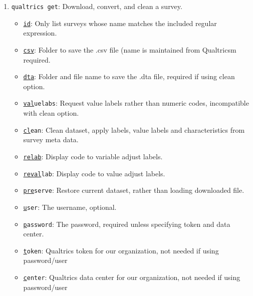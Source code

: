 {\begin{enumerate}
\begin{itemize}
\item \texttt{\underline{creater}ange(MDY:MDY)}: Only list surveys that were created in a date range.
\item \texttt{\underline{u}ser}: The username, optional.
\item \texttt{\underline{p}assword}: The password, required unless specifying token and data center.
\item \texttt{\underline{t}oken}: Qualtrics token for our organization, not needed if using password/user.
\item \texttt{\underline{c}enter}: Qualtrics data center for our organization, not needed if using password/user.
\end{itemize}
\item \texttt{qualtrics get}: Download, convert, and clean a survey.
\begin{itemize}
\item \texttt{\underline{id}}: Only list surveys whose name matches the included regular expression.
\item \texttt{\underline{csv}}: Folder to save the .csv file (name is maintained from Qualtricsm required.
\item \texttt{\underline{dta}}: Folder and file name to save the .dta file, required if using clean option.
\item \texttt{\underline{val}uelabs}: Request value labels rather than numeric codes, incompatible with clean option.
\item \texttt{\underline{cl}ean}: Clean dataset, apply labels, value labels and characteristics from survey meta data.
\item \texttt{\underline{relab}}: Display code to variable adjust labels.
\item \texttt{\underline{reval}lab}: Display code to value adjust labels.
\item \texttt{\underline{pre}serve}: Restore current dataset, rather than loading downloaded file.
\item \texttt{\underline{u}ser}: The username, optional.
\item \texttt{\underline{p}assword}: The password, required unless specifying token and data center.
\item \texttt{\underline{t}oken}: Qualtrics token for our organization, not needed if using password/user
\item \texttt{\underline{c}enter}: Qualtrics data center for our organization, not needed if using password/user
\end{itemize}


\end{enumerate}}
